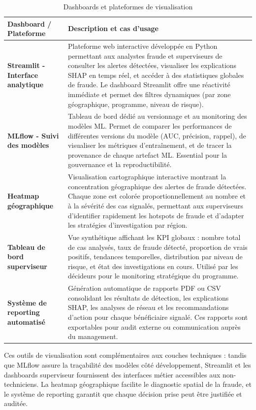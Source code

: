 \documentclass[a4paper, oneside, 12pt]{book}
\newcommand{\thead}[1]{\cellcolor{EYdark}\textcolor{white}{\textbf{#1}}}
\renewcommand{\thead}[1]{\cellcolor{EYyellow}\textcolor{EYdark}{\textbf{#1}}}
\begin{document}
\begin{table}[H]
\centering
\renewcommand{\arraystretch}{1.5}
\begin{tabular}{|p{3.5cm}|p{11.8cm}|}
\hline
\thead{Dashboard / Plateforme} & \thead{Description et cas d'usage} \\
\hline
\textbf{Streamlit - Interface analytique} & Plateforme web interactive développée en Python permettant aux analystes fraude et superviseurs de consulter les alertes détectées, visualiser les explications SHAP en temps réel, et accéder à des statistiques globales de fraude. Le dashboard Streamlit offre une réactivité immédiate et permet des filtres dynamiques (par zone géographique, programme, niveau de risque). \\
\hline
\textbf{MLflow - Suivi des modèles} & Tableau de bord dédié au versionnage et au monitoring des modèles ML. Permet de comparer les performances de différentes versions du modèle (AUC, précision, rappel), de visualiser les métriques d'entraînement, et de tracer la provenance de chaque artefact ML. Essential pour la gouvernance et la reproductibilité. \\
\hline
\textbf{Heatmap géographique} & Visualisation cartographique interactive montrant la concentration géographique des alertes de fraude détectées. Chaque zone est colorée proportionnellement au nombre et à la sévérité des cas signalés, permettant aux superviseurs d'identifier rapidement les hotspots de fraude et d'adapter les stratégies d'investigation par région. \\
\hline
\textbf{Tableau de bord superviseur} & Vue synthétique affichant les KPI globaux : nombre total de cas analysés, taux de fraude détecté, proportion de vrais positifs, tendances temporelles, distribution par niveau de risque, et état des investigations en cours. Utilisé par les décideurs pour le monitoring stratégique du programme. \\
\hline
\textbf{Système de reporting automatisé} & Génération automatique de rapports PDF ou CSV consolidant les résultats de détection, les explications SHAP, les analyses de réseau et les recommandations d'action pour chaque bénéficiaire signalé. Ces rapports sont exportables pour audit externe ou communication auprès du management. \\
\hline
\end{tabular}
\caption{Dashboards et plateformes de visualisation}
\end{table}

\hspace{0.5cm}Ces outils de visualisation sont complémentaires aux couches techniques : tandis que MLflow assure la traçabilité des modèles côté développement, Streamlit et les dashboards superviseur fournissent des interfaces métier accessibles aux non-techniciens. La heatmap géographique facilite le diagnostic spatial de la fraude, et le système de reporting garantit que chaque décision prise peut être justifiée et auditée.
\end{document}
